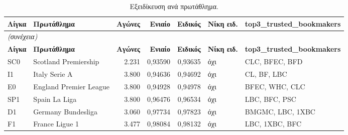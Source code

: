 {\scriptsize
\begin{longtable}{@{}llrrrll@{}}
\caption{Εξειδίκευση ανά πρωτάθλημα.}\label{app:ctx}\\
\toprule \textbf{Λίγκα} & \textbf{Πρωτάθλημα} & \textbf{Αγώνες} & \textbf{Ενιαίο} & \textbf{Ειδικός} & \textbf{Νίκη ειδ.} & \textbf{top3\_trusted\_bookmakers} \\\midrule\endfirsthead
\multicolumn{7}{l}{\emph{(συνέχεια)}}\\\toprule \textbf{Λίγκα} & \textbf{Πρωτάθλημα} & \textbf{Αγώνες} & \textbf{Ενιαίο} & \textbf{Ειδικός} & \textbf{Νίκη ειδ.} & \textbf{top3\_trusted\_bookmakers} \\\midrule\endhead
\bottomrule\endfoot
SC0 & Scotland Premiership & 2.231 & 0,93590 & 0,93635 & όχι & CLC, BFEC, BFD \\
I1 & Italy Serie A & 3.800 & 0,94636 & 0,94692 & όχι & CL, BF, LBC \\
E0 & England Premier League & 3.800 & 0,94928 & 0,94978 & όχι & BFEC, WHC, CLC \\
SP1 & Spain La Liga & 3.800 & 0,96476 & 0,96534 & όχι & LBC, BFC, PSC \\
D1 & Germany Bundesliga & 3.060 & 0,97734 & 0,97823 & όχι & BMGMC, LBC, 1XBC \\
F1 & France Ligue 1 & 3.477 & 0,98084 & 0,98132 & όχι & LBC, 1XBC, BFC \\
\end{longtable}
}

